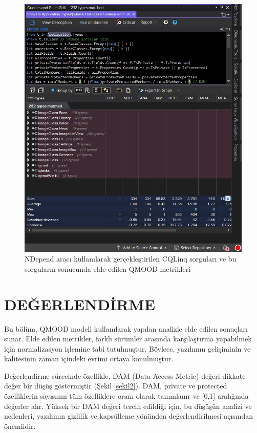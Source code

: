 \documentclass[conference]{IEEEtran}
\begin{document}
\begin{figure}[h]
	\centering
	\includegraphics[scale=0.5]{ndepend.jpg}
	\caption{NDepend aracı kullanılarak gerçekleştirilen CQLinq sorguları ve bu sorguların sonucunda elde edilen QMOOD metrikleri}
	\label{sekil1}
\end{figure}

\section{DEĞERLENDİRME}
Bu bölüm, QMOOD modeli kullanılarak yapılan analizle elde edilen sonuçları sunar. Elde edilen metrikler, farklı sürümler arasında karşılaştırma yapabilmek için normalizasyon işlemine tabi tutulmuştur. Böylece, yazılımın gelişiminin ve kalitesinin zaman içindeki evrimi ortaya konulmuştur.

Değerlendirme sürecinde özellikle, DAM (Data Access Metric) değeri dikkate değer bir düşüş göstermiştir (Şekil \ref{sekil2}). DAM, private ve protected özelliklerin sayısının tüm özelliklere oranı olarak tanımlanır ve [0,1] aralığında değerler alır. Yüksek bir DAM değeri tercih edildiği için, bu düşüşün analizi ve nedenleri, yazılımın gizlilik ve kapsülleme yönünden değerlendirilmesi açısından önemlidir. 
\end{document}
